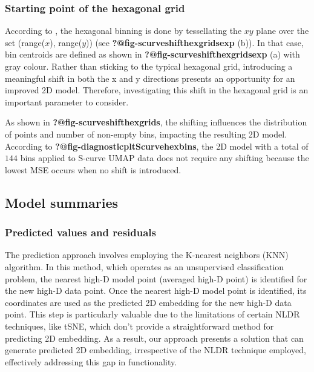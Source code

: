 \documentclass[
  12pt]{article}
\begin{document}
\hypertarget{starting-point-of-the-hexagonal-grid}{%
\subsubsection{Starting point of the hexagonal
grid}\label{starting-point-of-the-hexagonal-grid}}

According to \citet{Dan2023}, the hexagonal binning is done by
tessellating the \(xy\) plane over the set (range(\(x\)), range(\(y\)))
(see \textbf{?@fig-scurveshifthexgridsexp} (b)). In that case, bin
centroids are defined as shown in \textbf{?@fig-scurveshifthexgridsexp}
(a) with gray colour. Rather than sticking to the typical hexagonal
grid, introducing a meaningful shift in both the x and y directions
presents an opportunity for an improved 2D model. Therefore,
investigating this shift in the hexagonal grid is an important parameter
to consider.

As shown in \textbf{?@fig-scurveshifthexgrids}, the shifting influences
the distribution of points and number of non-empty bins, impacting the
resulting 2D model. According to
\textbf{?@fig-diagnosticpltScurvehexbins}, the 2D model with a total of
\(144\) bins applied to S-curve UMAP data does not require any shifting
because the lowest MSE occurs when no shift is introduced.

\hypertarget{sec-summary}{%
\subsection{Model summaries}\label{sec-summary}}

\hypertarget{predicted-values-and-residuals}{%
\subsubsection{Predicted values and
residuals}\label{predicted-values-and-residuals}}

The prediction approach involves employing the K-nearest neighbors (KNN)
algorithm. In this method, which operates as an unsupervised
classification problem, the nearest high-D model point (averaged high-D
point) is identified for the new high-D data point. Once the nearest
high-D model point is identified, its coordinates are used as the
predicted 2D embedding for the new high-D data point. This step is
particularly valuable due to the limitations of certain NLDR techniques,
like tSNE, which don't provide a straightforward method for predicting
2D embedding. As a result, our approach presents a solution that can
generate predicted 2D embedding, irrespective of the NLDR technique
employed, effectively addressing this gap in functionality.
\end{document}
